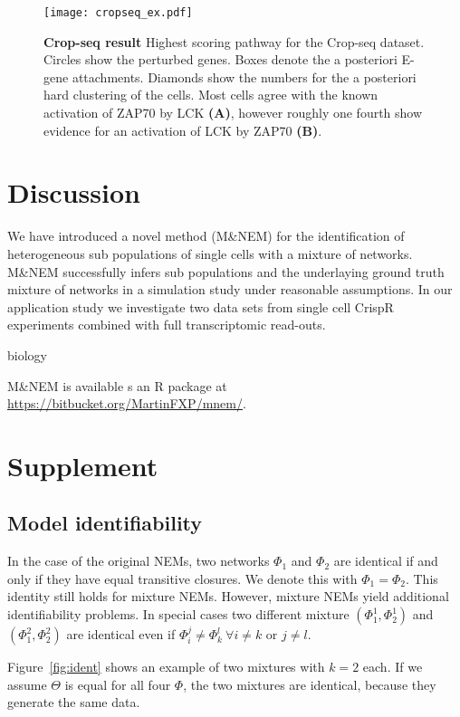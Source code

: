 \documentclass[12pt]{article}
\begin{document}
\begin{figure}
\texttt{[image: cropseq\_ex.pdf]}
\caption{\textbf{Crop-seq result} Highest scoring pathway for the Crop-seq dataset. Circles show the perturbed genes. Boxes denote the a posteriori E-gene attachments. Diamonds show the numbers for the a posteriori hard clustering of the cells. Most cells agree with the known activation of ZAP70 by LCK \textbf{(A)}, however roughly one fourth show evidence for an activation of LCK by ZAP70 \textbf{(B)}.}\label{fig:cropseq}
\end{figure}

\section{Discussion}

We have introduced a novel method (M\&NEM) for the identification of heterogeneous sub populations of single cells with a mixture of networks. M\&NEM successfully infers sub populations and the underlaying ground truth mixture of networks in a simulation study under reasonable assumptions. In our application study we investigate two data sets from single cell CrispR experiments combined with full transcriptomic read-outs.

biology

M\&NEM is available s an R package at \url{https://bitbucket.org/MartinFXP/mnem/}.

\section{Supplement}

\subsection{Model identifiability}

In the case of the original NEMs, two networks $\Phi_1$ and $\Phi_2$ are identical if and only if they have equal transitive closures. We denote this with $\Phi_1 = \Phi_2$. This identity still holds for mixture NEMs. However, mixture NEMs yield additional identifiability problems. In special cases two different mixture $(\Phi^1_1, \Phi_2^1)$ and $(\Phi_1^2, \Phi_2^2)$ are identical even if $\Phi_i^j \neq \Phi_k^l ~\forall i \neq k \text{ or } j \neq l$.

Figure~\ref{fig:ident} shows an example of two mixtures with $k=2$ each. If we assume $\Theta$ is equal for all four $\Phi$, the two mixtures are identical, because they generate the same data. 
\end{document}
